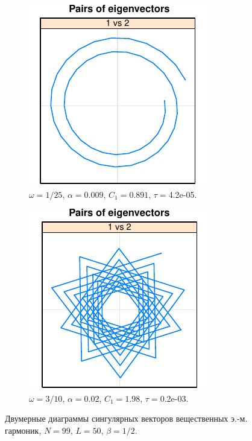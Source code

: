 \documentclass[specialist,
               substylefile = spbu.rtx,
               subf,href,colorlinks=true, 12pt]{disser}
\begin{document}
\begin{figure}[h]
\begin{subfigure}[b]{0.3\textwidth}
        \includegraphics[width=\textwidth]{re_ex_mod_omega_1_25}
        \caption{ \centering $\omega=1/25$, $\alpha = 0.009$, $C_1 = 0.891$, $\tau =$4.2e-05.}
    \end{subfigure}
    \begin{subfigure}[b]{0.3\textwidth}
        \includegraphics[width=\textwidth]{re_ex_mod_omega_3_10}
        \caption{ \centering $\omega=3/10$, $\alpha = 0.02$, $C_1 = 1.98$, $\tau =$0.2e-03.}
    \end{subfigure}
    \caption{Двумерные диаграммы сингулярных векторов вещественных э.-м. гармоник, $N=99$, $L=50$, $\beta=1/2$.}
    \label{fig:re_ex_mod_diagram}
\end{figure} 
\end{document}
